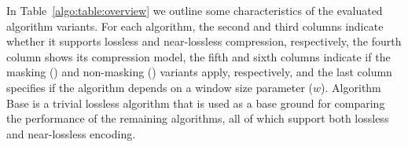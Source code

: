 In Table~\ref{algo:table:overview} we outline some characteristics of the evaluated algorithm variants. For each algorithm, the second and third columns indicate whether it supports lossless and near-lossless compression, respectively, the fourth column shows its compression model, the fifth and sixth columns indicate if the masking (\maskalgo) and non-masking (\NOmaskalgo) variants apply, respectively, and the last column specifies if the algorithm depends on a window size parameter ($w$). Algorithm Base is a trivial lossless algorithm that is used as a base ground for comparing the performance of the remaining algorithms, all of which support both lossless and near-lossless encoding.




